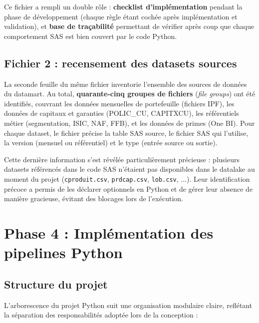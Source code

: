 Ce fichier a rempli un double rôle : \textbf{checklist d'implémentation} pendant la phase de développement (chaque règle étant cochée après implémentation et validation), et \textbf{base de traçabilité} permettant de vérifier après coup que chaque comportement SAS est bien couvert par le code Python.

\subsection{Fichier 2 : recensement des datasets sources}

La seconde feuille du même fichier inventorie l'ensemble des sources de données du datamart. Au total, \textbf{quarante-cinq groupes de fichiers} (\textit{file groups}) ont été identifiés, couvrant les données mensuelles de portefeuille (fichiers IPF), les données de capitaux et garanties (POLIC\_CU, CAPITXCU), les référentiels métier (segmentation, ISIC, NAF, FFB), et les données de primes (One BI). Pour chaque dataset, le fichier précise la table SAS source, le fichier SAS qui l'utilise, la version (mensuel ou référentiel) et le type (entrée source ou sortie).

Cette dernière information s'est révélée particulièrement précieuse : plusieurs datasets référencés dans le code SAS n'étaient pas disponibles dans le datalake au moment du projet (\texttt{cproduit.csv}, \texttt{prdcap.csv}, \texttt{lob.csv}, ...). Leur identification précoce a permis de les déclarer optionnels en Python et de gérer leur absence de manière gracieuse, évitant des blocages lors de l'exécution.

\section{Phase 4 : Implémentation des pipelines Python}

\subsection{Structure du projet}

L'arborescence du projet Python suit une organisation modulaire claire, reflétant la séparation des responsabilités adoptée lors de la conception :

